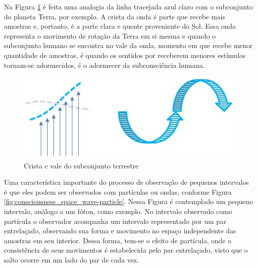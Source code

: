 Na Figura \ref{fig:consciousness_amplitude_crest_valley} é feita uma analogia da linha tracejada azul claro com o subconjunto do planeta Terra, por exemplo. A crista da onda é parte que recebe mais amostras e, portanto, é a parte clara e quente proveniente do Sol. Essa onda representa o movimento de rotação da Terra em si mesma e quando o subconjunto humano se encontra no vale da onda, momento em que recebe menor quantidade de amostras, é quando os sentidos por receberem menores estímulos tornam-se adormecidos, é o adormecer da subconsciência humana.
	\begin{figure}[H]
	\caption{Crista e vale do subconjunto terrestre}
	\label{fig:consciousness_amplitude_crest_valley}
	\centering
	\includegraphics[scale=.6]{sections/images/consciousness_amplitude_crest_valley.jpg}
	\end{figure}

Uma característica importante do processo de observação de pequenos intervalos é que eles podem ser observados com partículas ou ondas, conforme Figura \ref{fig:consciousness_space_wave-particle}. Nessa Figura é contemplado um pequeno intervalo, análogo a um fóton, como exemplo. No intervalo observado como partícula o observador acompanha um intervalo representado por um par entrelaçado, observando sua forma e movimento no espaço independente das amostras em seu interior. Dessa forma, tem-se o efeito de partícula, onde a consistência de seus movimentos é estabelecida pelo par entrelaçado, visto que o salto ocorre em um lado do par de cada vez. 

